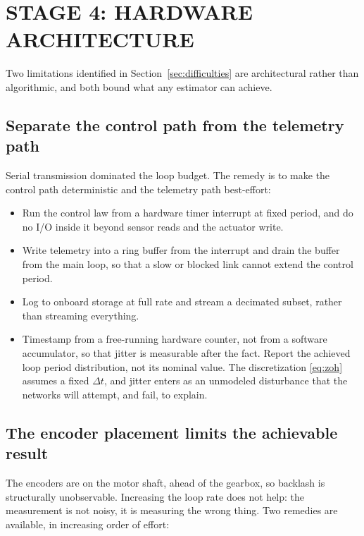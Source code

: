 \section{STAGE 4: HARDWARE ARCHITECTURE}

Two limitations identified in Section~\ref{sec:difficulties} are architectural
rather than algorithmic, and both bound what any estimator can achieve.

\subsection{Separate the control path from the telemetry path}

Serial transmission dominated the loop budget. The remedy is to make the control
path deterministic and the telemetry path best-effort:

\begin{itemize}[leftmargin=*]
\item Run the control law from a hardware timer interrupt at fixed period, and
do no I/O inside it beyond sensor reads and the actuator write.
\item Write telemetry into a ring buffer from the interrupt and drain the buffer
from the main loop, so that a slow or blocked link cannot extend the control
period.
\item Log to onboard storage at full rate and stream a decimated subset, rather
than streaming everything.
\item Timestamp from a free-running hardware counter, not from a software
accumulator, so that jitter is measurable after the fact. Report the
achieved loop period distribution, not its nominal value. The discretization
\eqref{eq:zoh} assumes a fixed $\Delta t$, and jitter enters as an unmodeled
disturbance that the networks will attempt, and fail, to explain.
\end{itemize}

\subsection{The encoder placement limits the achievable result}

The encoders are on the motor shaft, ahead of the gearbox, so backlash is
structurally unobservable. Increasing the loop rate does not help: the
measurement is not noisy, it is measuring the wrong thing. Two remedies are
available, in increasing order of effort:

